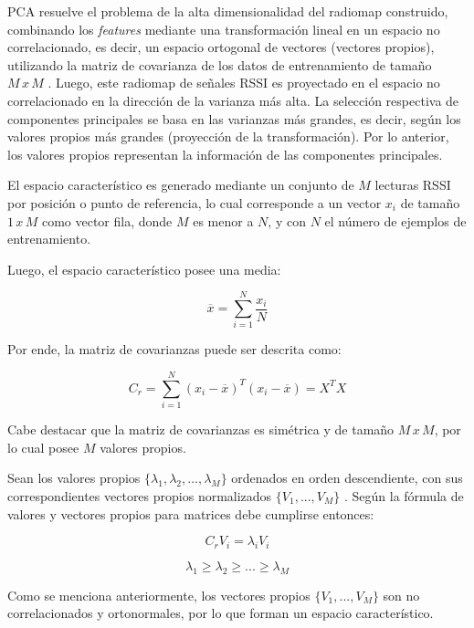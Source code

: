 PCA resuelve el problema de la alta dimensionalidad del radiomap construido, combinando los \textit{features} mediante una transformación lineal en un espacio no correlacionado, es decir, un espacio ortogonal de vectores (vectores propios), utilizando la matriz de covarianza de los datos de entrenamiento de tamaño $ M \, x \, M$ . Luego, este radiomap de señales RSSI es proyectado en el espacio no correlacionado en la dirección de la varianza más alta. La selección respectiva de componentes principales se basa en las varianzas más grandes, es decir, según los valores propios más grandes (proyección de la transformación). Por lo anterior, los valores propios representan la información de las componentes principales.

El espacio característico es generado mediante un conjunto de $M$ lecturas RSSI por posición o punto de referencia, lo cual corresponde a un vector $x_{i}$ de tamaño $ 1 \, x \, M$ como vector fila, donde $ M$ es menor a $ N$, y con $ N$ el número de ejemplos de entrenamiento.

Luego, el espacio característico posee una media:

\begin{equation} 
\overline{x} = \sum_{i=1}^{N} \frac{x_{i}}{N}
\end{equation}

Por ende, la matriz de covarianzas puede ser descrita como:

\begin{equation} C_{r} = \sum_{i=1}^{N} (x_{i} - \overline{x})^{T}(x_{i} - \overline{x}) = X^{T}X
\end{equation}

Cabe destacar que la matriz de covarianzas es simétrica y de tamaño $M \, x \, M$, por lo cual posee $M$ valores propios.

Sean los valores propios $ \{ \lambda_{1}, \lambda_{2}, ..., \lambda_{M} \} $ ordenados en orden descendiente, con sus correspondientes vectores propios normalizados $ \{ V_{1}, ... , V_{M} \} $ . Según la fórmula de valores y vectores propios para matrices debe cumplirse entonces:

\begin{equation} 
C_{r} V_{i} =  \lambda_{i} V_{i}
\end{equation}

\begin{equation}
\lambda_{1} \geq \lambda_{2} \geq ... \geq \lambda_{M}
\end{equation}

Como se menciona anteriormente, los vectores propios $ \{ V_{1}, ... , V_{M} \} $ son no correlacionados y ortonormales, por lo que forman un espacio característico.

